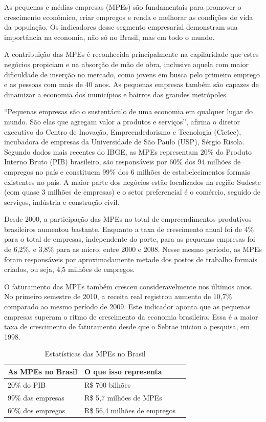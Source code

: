 As pequenas e médias empresas (MPEs) são fundamentais para promover o crescimento econômico, criar empregos e renda e melhorar as condições de vida da população. Os indicadores desse segmento empresarial demonstram sua importância na economia, não só no Brasil, mas em todo o mundo.

A contribuição das MPEs é reconhecida principalmente na capilaridade que estes negócios propiciam e na absorção de mão de obra, inclusive aquela com maior dificuldade de inserção no mercado, como jovens em busca pelo primeiro emprego e as pessoas com mais de 40 anos. As pequenas empresas também são capazes de dinamizar a economia dos municípios e bairros das grandes metrópoles.

“Pequenas empresas são o sustentáculo de uma economia em qualquer lugar do mundo. São elas que agregam valor a produtos e serviços”, afirma o diretor executivo do Centro de Inovação, Empreendedorismo e Tecnologia (Cietec), incubadora de empresas da Universidade de São Paulo (USP), Sérgio Risola. Segundo dados mais recentes do IBGE, as MPEs representam 20\% do Produto Interno Bruto (PIB) brasileiro, são responsáveis por 60\% dos 94 milhões de empregos no país e constituem 99\% dos 6 milhões de estabelecimentos formais existentes no país. A maior parte dos negócios estão localizados na região Sudeste (com quase 3 milhões de empresas) e o setor preferencial é o comércio, seguido de serviços, indústria e construção civil.

Desde 2000, a participação das MPEs no total de empreendimentos produtivos brasileiros aumentou bastante. Enquanto a taxa de crescimento anual foi de 4\% para o total de empresas, independente do porte, para as pequenas empresas foi de 6,2\%, e 3,8\% para as micro, entre 2000 e 2008. Nesse mesmo período, as MPEs foram responsáveis por aproximadamente metade dos postos de trabalho formais criados, ou seja, 4,5 milhões de empregos.

O faturamento das MPEs também cresceu consideravelmente nos últimos anos. No primeiro semestre de 2010, a receita real registrou aumento de 10,7\% comparado ao mesmo período de 2009. Este indicador aponta que as pequenas empresas superam o ritmo de crescimento da economia brasileira. Essa é a maior taxa de crescimento de faturamento desde que o Sebrae iniciou a pesquisa, em 1998.

\begin{table}[!htpb]
 \centering
    \begin{tabular}{|l|p{5cm}|c|} 
    \hline
        \textbf{As MPEs no Brasil} & \textbf{O que isso representa} \\
    \hline
        20\% do PIB & R\$ 700 bilhões \\
    \hline
        99\% das empresas & R\$ 5,7 milhões de MPEs \\
    \hline
        60\% dos empregos & R\$ 56,4 milhões de empregos \\
    \hline
    \end{tabular}
    \caption{Estatísticas das MPEs no Brasil}
    \label{t_fixa}
\end{table}